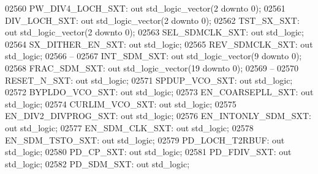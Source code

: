 \begin{DoxyCode}
02560     PW\_DIV4\_LOCH\_SXT:   \textcolor{keywordflow}{out} \textcolor{comment}{std\_logic\_vector}(\textcolor{vhdllogic}{}\textcolor{vhdllogic}{2} \textcolor{keywordflow}{downto} \textcolor{vhdllogic}{}\textcolor{vhdllogic}{0});
02561     DIV\_LOCH\_SXT:   \textcolor{keywordflow}{out} \textcolor{comment}{std\_logic\_vector}(\textcolor{vhdllogic}{}\textcolor{vhdllogic}{2} \textcolor{keywordflow}{downto} \textcolor{vhdllogic}{}\textcolor{vhdllogic}{0});
02562     TST\_SX\_SXT: \textcolor{keywordflow}{out} \textcolor{comment}{std\_logic\_vector}(\textcolor{vhdllogic}{}\textcolor{vhdllogic}{2} \textcolor{keywordflow}{downto} \textcolor{vhdllogic}{}\textcolor{vhdllogic}{0});
02563     SEL\_SDMCLK\_SXT: \textcolor{keywordflow}{out} \textcolor{comment}{std\_logic};
02564     SX\_DITHER\_EN\_SXT:   \textcolor{keywordflow}{out} \textcolor{comment}{std\_logic};
02565     REV\_SDMCLK\_SXT: \textcolor{keywordflow}{out} \textcolor{comment}{std\_logic};
02566 \textcolor{keyword}{    --}
02567     INT\_SDM\_SXT:    \textcolor{keywordflow}{out} \textcolor{comment}{std\_logic\_vector}(\textcolor{vhdllogic}{}\textcolor{vhdllogic}{9} \textcolor{keywordflow}{downto} \textcolor{vhdllogic}{}\textcolor{vhdllogic}{0});
02568     FRAC\_SDM\_SXT:   \textcolor{keywordflow}{out} \textcolor{comment}{std\_logic\_vector}(\textcolor{vhdllogic}{}\textcolor{vhdllogic}{19} \textcolor{keywordflow}{downto} \textcolor{vhdllogic}{}\textcolor{vhdllogic}{0});
02569 \textcolor{keyword}{    --}
02570     RESET\_N\_SXT:    \textcolor{keywordflow}{out} \textcolor{comment}{std\_logic};
02571     SPDUP\_VCO\_SXT:  \textcolor{keywordflow}{out} \textcolor{comment}{std\_logic};
02572     BYPLDO\_VCO\_SXT: \textcolor{keywordflow}{out} \textcolor{comment}{std\_logic};
02573     EN\_COARSEPLL\_SXT:   \textcolor{keywordflow}{out} \textcolor{comment}{std\_logic};
02574     CURLIM\_VCO\_SXT: \textcolor{keywordflow}{out} \textcolor{comment}{std\_logic};
02575     EN\_DIV2\_DIVPROG\_SXT:    \textcolor{keywordflow}{out} \textcolor{comment}{std\_logic};
02576     EN\_INTONLY\_SDM\_SXT: \textcolor{keywordflow}{out} \textcolor{comment}{std\_logic};
02577     EN\_SDM\_CLK\_SXT: \textcolor{keywordflow}{out} \textcolor{comment}{std\_logic};
02578     EN\_SDM\_TSTO\_SXT:    \textcolor{keywordflow}{out} \textcolor{comment}{std\_logic};
02579     PD\_LOCH\_T2RBUF: \textcolor{keywordflow}{out} \textcolor{comment}{std\_logic};
02580     PD\_CP\_SXT:  \textcolor{keywordflow}{out} \textcolor{comment}{std\_logic};
02581     PD\_FDIV\_SXT:    \textcolor{keywordflow}{out} \textcolor{comment}{std\_logic};
02582     PD\_SDM\_SXT: \textcolor{keywordflow}{out} \textcolor{comment}{std\_logic};

\end{DoxyCode}
